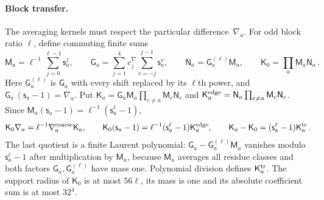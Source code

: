 \paragraph{Block transfer.}
The averaging kernels must respect the particular difference~$\nabla_a$. For odd block ratio $\ell$, define commuting finite sums
\begin{equation*}
\mathsf M_a=\ell^{-1}\sum_{j=0}^{\ell-1}\mathsf s_a^j,\qquad
\mathsf G_a=\sum_{j=1}^4c^\nabla_j\sum_{v=-j}^{j-1}\mathsf s_a^v,\qquad
\mathsf N_a=\mathsf G_a^{(\ell)}\mathsf M_a,\qquad \mathsf K_0=\prod_a\mathsf M_a\mathsf N_a\,.
\end{equation*}
Here $\mathsf G_a^{(\ell)}$ is $\mathsf G_a$ with every shift replaced by its $\ell$th power, and $\mathsf G_a\,(\mathsf s_a-1)=\nabla_a$. Put $\mathsf K_a=\mathsf G_a\mathsf M_a\prod_{c\ne a}\mathsf M_c\mathsf N_c$ and $\mathsf K_a^{\rm edge}=\mathsf N_a\prod_{c\ne a}\mathsf M_c\mathsf N_c$. Since $\mathsf M_a(\mathsf s_a-1)=\ell^{-1}(\mathsf s_a^\ell-1)$,
\begin{equation*}
\mathsf K_0\nabla_a=\ell^{-1}\nabla_a^{\rm coarse}\mathsf K_a,\qquad
\mathsf K_0(\mathsf s_a-1)=\ell^{-1}(\mathsf s_a^\ell-1)\mathsf K_a^{\rm edge},\qquad
\mathsf K_a-\mathsf K_0=(\mathsf s_a^\ell-1)\mathsf K_a^{\rm tr}\,.
\end{equation*}
The last quotient is a finite Laurent polynomial: $\mathsf G_a-\mathsf G_a^{(\ell)}\mathsf M_a$ vanishes modulo $\mathsf s_a^\ell-1$ after multiplication by $\mathsf M_a$, because $\mathsf M_a$ averages all residue classes and both factors $\mathsf G_a,\mathsf G_a^{(\ell)}$ have mass one. Polynomial division defines $\mathsf K_a^{\rm tr}$. The support radius of $\mathsf K_0$ is at most $56\ell$, its mass is one and its absolute coefficient sum is at most $32^4$.

